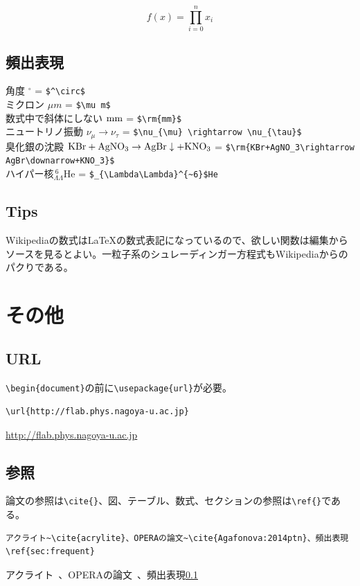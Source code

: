 \documentclass[a4j]{jsarticle}
\begin{document}
\begin{equation}  f(x) = \prod_{i=0}^n x_i \end{equation}
\subsection{頻出表現}
\label{sec:frequent}
\noindent
角度 $^\circ$ = \verb|$^\circ$|\\
ミクロン $\mu m$ = \verb|$\mu m$|\\
数式中で斜体にしない $\rm{mm}$ = \verb|$\rm{mm}$|\\
ニュートリノ振動 $\nu_{\mu} \rightarrow \nu_{\tau}$ = \verb|$\nu_{\mu} \rightarrow \nu_{\tau}$|\\
臭化銀の沈殿 $\rm{KBr+AgNO_3\rightarrow AgBr\downarrow+KNO_3}$ = \verb|$\rm{KBr+AgNO_3\rightarrow AgBr\downarrow+KNO_3}$|\\
ハイパー核$_{\Lambda\Lambda}^{~6}$He = \verb|$_{\Lambda\Lambda}^{~6}$He|\\
\subsection{Tips}
Wikipediaの数式は\LaTeX  の数式表記になっているので、欲しい関数は編集からソースを見るとよい。一粒子系のシュレーディンガー方程式もWikipediaからのパクりである。
\newpage
\section{その他}
\subsection{URL}
\verb|\begin{document}|の前に\verb|\usepackage{url}|が必要。
\begin{verbatim}
\url{http://flab.phys.nagoya-u.ac.jp}
\end{verbatim}
\url{http://flab.phys.nagoya-u.ac.jp}

\subsection{参照}
論文の参照は\verb|\cite{}|、図、テーブル、数式、セクションの参照は\verb|\ref{}|である。
\begin{verbatim}
アクライト~\cite{acrylite}、OPERAの論文~\cite{Agafonova:2014ptn}、頻出表現\ref{sec:frequent}
\end{verbatim}
アクライト~\cite{acrylite}、OPERAの論文~\cite{Agafonova:2014ptn}、頻出表現\ref{sec:frequent}
\end{document}
